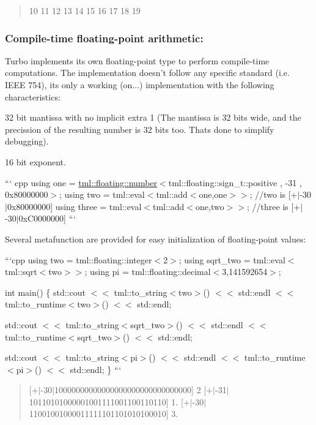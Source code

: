 \begin{quote}
10 11 12 13 14 15 16 17 18 19 \end{quote}


\subsubsection*{Compile-\/time floating-\/point arithmetic\+:}

Turbo implements its own floating-\/point type to perform compile-\/time computations. The implementation doesn't follow any specific standard (i.\+e. I\+E\+E\+E 754), its only a working (on...) implementation with the following characteristics\+:


\begin{DoxyItemize}
\item 32 bit mantissa with no implicit extra 1 (The mantissa is 32 bits wide, and the precission of the resulting number is 32 bits too. Thats done to simplify debugging).
\item 16 bit exponent.
\end{DoxyItemize}

``` cpp using one = \hyperlink{structtml_1_1floating_1_1number}{tml\+::floating\+::number}$<$tml\+::floating\+::sign\+\_\+t\+::positive , -\/31 , 0x80000000$>$; using two = tml\+::eval$<$tml\+::add$<$one,one$>$$>$; //two is \mbox{[}+$\vert$-\/30$\vert$0x80000000\mbox{]} using three = tml\+::eval$<$tml\+::add$<$one,two$>$$>$; //three is \mbox{[}+$\vert$-\/30$\vert$0x\+C0000000\mbox{]} ```

Several metafunction are provided for easy initialization of floating-\/point values\+:

```cpp using two = tml\+::floating\+::integer$<$2$>$; using sqrt\+\_\+two = tml\+::eval$<$tml\+::sqrt$<$two$>$$>$; using pi = tml\+::floating\+::decimal$<$3,141592654$>$;

int main() \{ std\+::cout $<$$<$ tml\+::to\+\_\+string$<$two$>$() $<$$<$ std\+::endl $<$$<$ tml\+::to\+\_\+runtime$<$two$>$() $<$$<$ std\+::endl;

std\+::cout $<$$<$ tml\+::to\+\_\+string$<$sqrt\+\_\+two$>$() $<$$<$ std\+::endl $<$$<$ tml\+::to\+\_\+runtime$<$sqrt\+\_\+two$>$() $<$$<$ std\+::endl;

std\+::cout $<$$<$ tml\+::to\+\_\+string$<$pi$>$() $<$$<$ std\+::endl $<$$<$ tml\+::to\+\_\+runtime$<$pi$>$() $<$$<$ std\+::endl; \} ```

\begin{quote}
\mbox{[}+$\vert$-\/30$\vert$10000000000000000000000000000000\mbox{]} 2 \mbox{[}+$\vert$-\/31$\vert$10110101000001001111001100110110\mbox{]} 1. \mbox{[}+$\vert$-\/30$\vert$11001001000011111101101010100010\mbox{]} 3. \end{quote}


